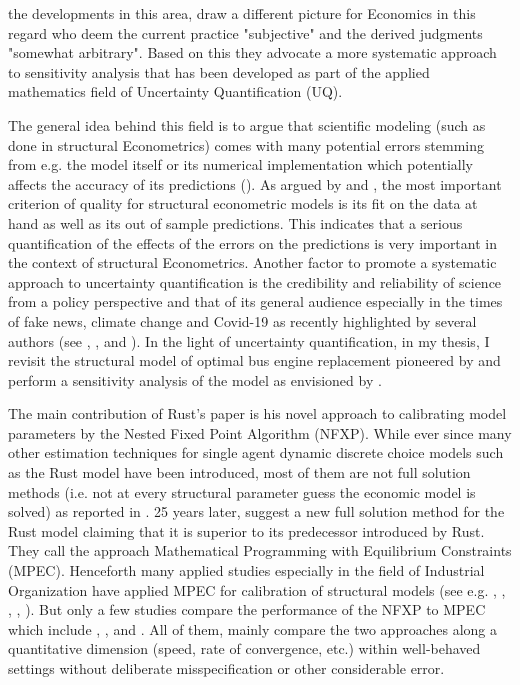 the developments in this area, \cite{Harenberg.2019} draw a different picture for Economics in this regard who deem the current practice "subjective" and the derived judgments "somewhat arbitrary". Based on this they advocate a more systematic approach to sensitivity analysis that has been developed as part of the applied mathematics field of Uncertainty Quantification (UQ).

The general idea behind this field is to argue that scientific modeling (such as done in structural Econometrics) comes with many potential errors stemming from e.g. the model itself or its numerical implementation which potentially affects the accuracy of its predictions (\cite{Smith.2013}). As argued by \cite{Keane.2010} and \cite{Rust.2010}, the most important criterion of quality for structural econometric models is its fit on the data at hand as well as its out of sample predictions. This indicates that a serious quantification of the effects of the errors on the predictions is very important in the context of structural Econometrics. Another factor to promote a systematic approach to uncertainty quantification is the credibility and reliability of science from a policy perspective and that of its general audience especially in the times of fake news, climate change and Covid-19 as recently highlighted by several authors (see \cite{Fischhoff.2014} \cite{DeBruin.2019}, \cite{VanDerBles.2019}, \cite{Manski.2019} and \cite{Manski.2020}). In the light of uncertainty quantification, in my thesis, I revisit the structural model of optimal bus engine replacement pioneered by \cite{Rust.1987} and perform a sensitivity analysis of the model as envisioned by \cite{Leamer.1983}.

The main contribution of Rust's paper is his novel approach to calibrating model parameters by the Nested Fixed Point Algorithm (NFXP). While ever since many other estimation techniques for single agent dynamic discrete choice models such as the Rust model have been introduced, most of them are not full solution methods (i.e. not at every structural parameter guess the economic model is solved) as reported in \cite{Aguirregabiri.2010}. 25 years later, \cite{Su.Judd.2012} suggest a new full solution method for the Rust model claiming that it is superior to its predecessor introduced by Rust. They call the approach Mathematical Programming with Equilibrium Constraints (MPEC). Henceforth many applied studies especially in the field of Industrial Organization have applied MPEC for calibration of structural models (see e.g. \cite{Aryal.2013}, \cite{Kaiser.2014}, \cite{Hubbard.2009}, \cite{Reynaert.2014}, \cite{Freyberger.2015}). But only a few studies compare the performance of the NFXP to MPEC which include \cite{Su.Judd.2012}, \cite{Dube.Fox.Su.2012}, \cite{Iskhakov.2016} and \cite{Dong.Hsieh.Zhang.2017}. All of them, mainly compare the two approaches along a quantitative dimension (speed, rate of convergence, etc.) within well-behaved settings without deliberate misspecification or other considerable error.

